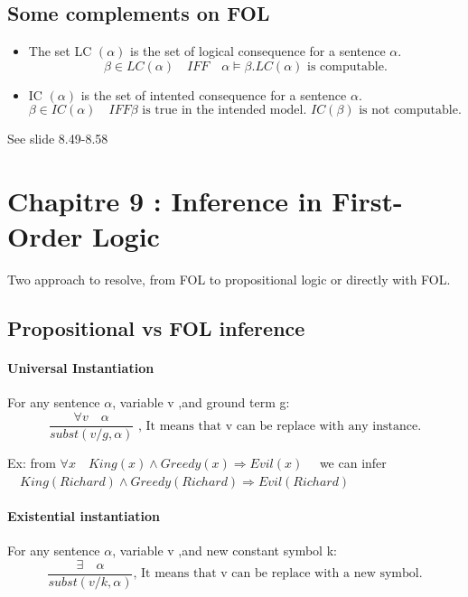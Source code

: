\subsection{Some complements on FOL}
	\begin{itemize}
		\item The set LC $(\alpha)$ is the set of logical consequence for a sentence $\alpha$. 
            $$\beta \in LC(\alpha) \quad IFF \quad \alpha \models \beta. LC(\alpha) \textrm{ is computable}.$$
	
		\item IC $(\alpha)$ is the set of intented consequence for a sentence $\alpha$.
            $$\beta \in IC(\alpha) \quad IFF \beta \textrm{ is true in the intended model. } IC (\beta) \textrm{ is not computable. }$$
	\end{itemize}	

See slide 8.49-8.58

\section{Chapitre 9 : Inference in First-Order Logic }

Two approach  to resolve,  from FOL to  propositional logic  or directly
with FOL.

\subsection{Propositional vs FOL inference}

\paragraph{Universal   Instantiation}   For   any   sentence   $\alpha$,
variable    v   ,and    ground    term    g:   $$\frac{\forall    v\quad
\alpha}{subst({v/g},\alpha)} \textrm{ ,  It means that v  can be replace
with any instance.} $$

  Ex:   from   $\forall    x\quad   King(x)\wedge   Greedy(x)\Rightarrow
  Evil(x)\quad   $   we  can   infer   $\quad   King(  Richard)   \wedge
  Greedy(Richard) \Rightarrow Evil(Richard)$

\paragraph{Existential   instantiation}  For   any  sentence   $\alpha$,
variable v ,and new constant symbol k:
$$\frac{\exists\quad\alpha}{subst({v/k},\alpha)} \textrm{, It means that
v can be replace with a new symbol.} $$

